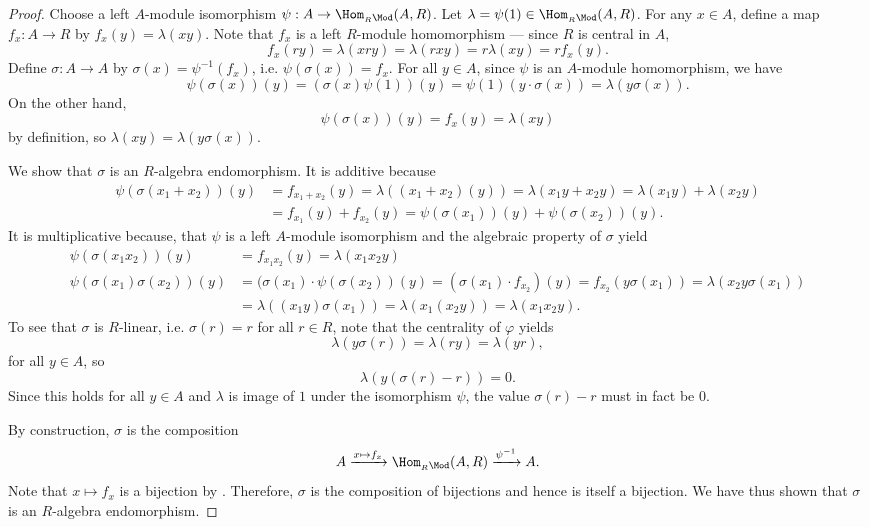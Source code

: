 \begin{proof}
    Choose a left $A$-module isomorphism $\psi: A \to \Hom_{{}_R\Mod}(A,R)$. Let $\lambda = \psi(1) \in \Hom_{{}_R \Mod}(A,R)$. For any $x \in A$, define a map $f_x: A \to R$ by $f_x(y) = \lambda(xy)$. Note that $f_x$ is a left $R$-module homomorphism --- since $R$ is central in $A$,
    $$f_x(ry) = \lambda(xry) = \lambda(rxy) = r \lambda(xy) = rf_x(y).$$
    Define $\sigma: A \to A$ by $\sigma(x) = \psi^{-1}(f_x)$, i.e. $\psi(\sigma(x)) = f_x$. For all $y \in A$, since $\psi$ is an $A$-module homomorphism, we have
    $$\psi(\sigma(x))(y) = (\sigma(x) \psi(1))(y) = \psi(1)(y \cdot \sigma(x)) = \lambda(y \sigma(x)).$$
    On the other hand, 
    $$\psi(\sigma(x))(y) = f_x(y) = \lambda(xy)$$ 
    by definition, so $\lambda(xy) = \lambda(y \sigma(x))$.

    We show that $\sigma$ is an $R$-algebra endomorphism. It is additive because
    \begin{align*}
    \psi(\sigma(x_1+x_2))(y) &= f_{x_1+x_2}(y) = \lambda((x_1+x_2)(y)) = \lambda(x_1y+x_2y) = \lambda(x_1y)+\lambda(x_2y)  \\
    &= f_{x_1}(y) + f_{x_2}(y) = \psi(\sigma(x_1))(y) + \psi(\sigma(x_2))(y).
    \end{align*}
    It is multiplicative because, that $\psi$ is a left $A$-module isomorphism and the algebraic property of $\sigma$ yield
    \begin{align*}
        \psi(\sigma(x_1x_2))(y) &= f_{x_1x_2}(y) = \lambda(x_1x_2 y) \\
    \psi(\sigma(x_1)\sigma(x_2))(y) &= (\sigma(x_1) \cdot \psi(\sigma(x_2))(y) = (\sigma(x_1) \cdot f_{x_2}) (y) = f_{x_2} (y \sigma(x_1)) = \lambda(x_2 y \sigma(x_1)) \\
    &= \lambda((x_1 y) \sigma(x_1)) = \lambda(x_1 (x_2y)) = \lambda(x_1 x_2y).
    \end{align*}
    To see that $\sigma$ is $R$-linear, i.e. $\sigma(r) = r$ for all $r \in R$, note that the centrality of $\varphi$ yields
    $$\lambda(y\sigma(r)) = \lambda(ry) = \lambda(yr),$$
    for all $y \in A$, so 
    $$\lambda(y(\sigma(r)-r)) = 0.$$
    Since this holds for all $y \in A$ and $\lambda$ is image of $1$ under the isomorphism $\psi$, the value $\sigma(r)-r$ must in fact be $0$.

    By construction, $\sigma$ is the composition 
    $$A \xrightarrow{x \mapsto f_x} \Hom_{{}_R \Mod} (A,R) \xrightarrow{\psi^{-1}} A.$$
    Note that $x \mapsto f_x$ is a bijection by . Therefore, $\sigma$ is the composition of bijections and hence is itself a bijection. We have thus shown that $\sigma$ is an $R$-algebra endomorphism. 
\end{proof}